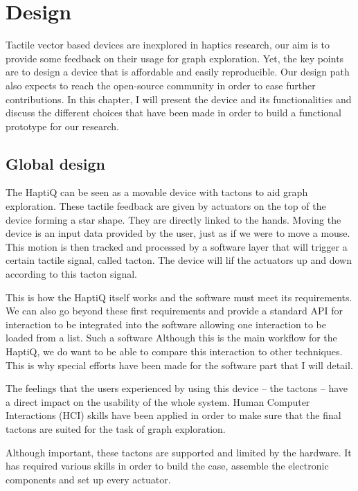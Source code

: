 \chapter{Design}

Tactile vector based devices are inexplored in haptics research, our aim
is to provide some feedback on their usage for graph exploration. Yet,
the key points are to design a device that is affordable and easily
reproducible. Our design path also expects to reach the open-source
community in order to ease further contributions. In this chapter, I
will present the device and its functionalities and discuss the
different choices that have been made in order to build a functional
prototype for our research.

\section{Global design}\label{global-design}

The HaptiQ can be seen as a movable device with tactons to aid graph
exploration. These tactile feedback are given by actuators on the top of
the device forming a star shape. They are directly linked to the hands.
Moving the device is an input data provided by the user, just as if we
were to move a mouse. This motion is then tracked and processed by a
software layer that will trigger a certain tactile signal, called
tacton. The device will lif the actuators up and down according to this
tacton signal.

This is how the HaptiQ itself works and the software must meet its
requirements. We can also go beyond these first requirements and provide
a standard API for interaction to be integrated into the software
allowing one interaction to be loaded from a list. Such a software
Although this is the main workflow for the HaptiQ, we do want to be able
to compare this interaction to other techniques. This is why special
efforts have been made for the software part that I will detail.

The feelings that the users experienced by using this device -- the
tactons -- have a direct impact on the usability of the whole system.
Human Computer Interactions (HCI) skills have been applied in order to
make sure that the final tactons are suited for the task of graph
exploration.

Although important, these tactons are supported and limited by the
hardware. It has required various skills in order to build the case,
assemble the electronic components and set up every actuator.

